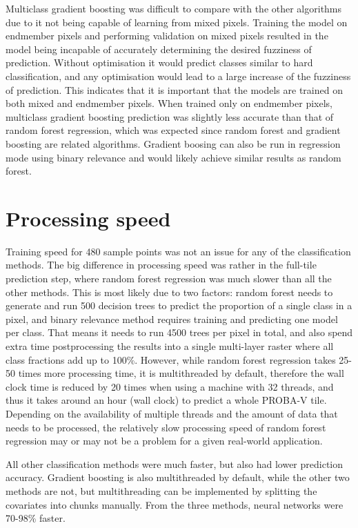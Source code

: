 \documentclass[a4paper,10pt]{book}
\begin{document}
Multiclass gradient boosting was difficult to compare with the other algorithms due to it not being capable of learning from mixed pixels. Training the model on endmember pixels and performing validation on mixed pixels resulted in the model being incapable of accurately determining the desired fuzziness of prediction. Without optimisation it would predict classes similar to hard classification, and any optimisation would lead to a large increase of the fuzziness of prediction. This indicates that it is important that the models are trained on both mixed and endmember pixels. When trained only on endmember pixels, multiclass gradient boosting prediction was slightly less accurate than that of random forest regression, which was expected since random forest and gradient boosting are related algorithms. Gradient boosing can also be run in regression mode using binary relevance and would likely achieve similar results as random forest.

\section{Processing speed}

Training speed for 480 sample points was not an issue for any of the classification methods. The big difference in processing speed was rather in the full-tile prediction step, where random forest regression was much slower than all the other methods. This is most likely due to two factors: random forest needs to generate and run 500 decision trees to predict the proportion of a single class in a pixel, and binary relevance method requires training and predicting one model per class. That means it needs to run 4500 trees per pixel in total, and also spend extra time postprocessing the results into a single multi-layer raster where all class fractions add up to 100\%. However, while random forest regression takes 25-50 times more processing time, it is multithreaded by default, therefore the wall clock time is reduced by 20 times when using a machine with 32 threads, and thus it takes around an hour (wall clock) to predict a whole PROBA-V tile. Depending on the availability of multiple threads and the amount of data that needs to be processed, the relatively slow processing speed of random forest regression may or may not be a problem for a given real-world application.

All other classification methods were much faster, but also had lower prediction accuracy. Gradient boosting is also multithreaded by default, while the other two methods are not, but multithreading can be implemented by splitting the covariates into chunks manually. From the three methods, neural networks were 70-98\% faster.
\end{document}

